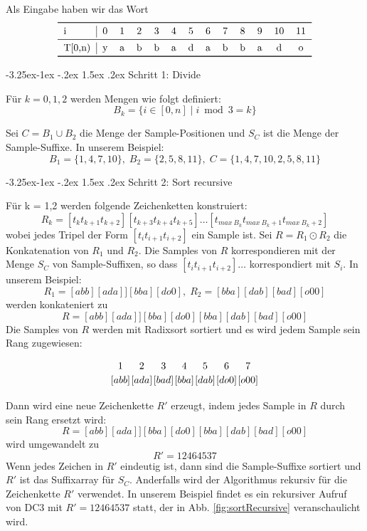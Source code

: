\documentclass[12pt]{report}
\makeatletter
\renewcommand\paragraph{\@startsection{paragraph}{4}{\z@}%
    {-3.25ex\@plus -1ex \@minus -.2ex}%
    {1.5ex \@plus .2ex}%
    {\normalfont\normalsize\bfseries}}
\makeatother
\begin{document}
Als Eingabe haben wir das Wort
$$
\begin{tabular}{l|c c c c c c c c c c c c}
    \toprule
    i    & 0 & 1 & 2 & 3 & 4 & 5 & 6 & 7 & 8 & 9 & 10 & 11 \\
    \midrule
    T[0,n) & y & a & b & b & a & d & a & b & b & a & d  & o  \\
    \bottomrule
\end{tabular}
$$

\paragraph{Schritt 1: Divide}

Für $k = 0,1,2$ werden Mengen wie folgt definiert:
$$
B_k = \{ i \in [0,n] \mid i \bmod{3} = k\}
$$

Sei $C = B_1 \cup B_2$ die Menge der Sample-Positionen und $S_C$ ist die Menge der Sample-Suffixe. In unserem Beispiel:
$$
B_1 = \{1,4,7,10\},\;B_2 = \{2,5,8,11\},\;C = \{1,4,7,10,2,5,8,11\}
$$

\paragraph{Schritt 2: Sort recursive}

Für k = 1,2 werden folgende Zeichenketten konstruiert:
$$
R_k = [t_k t_{k+1} t_{k+2}][t_{k+3} t_{k+4} t_{k+5}] \dots [t_{max\:B_k} t_{max\:B_k + 1} t_{max\:B_k + 2}]
$$
wobei jedes Tripel der Form $[t_i t_{i+1} t_{i+2}]$ ein Sample ist. Sei $R = R_1 \odot R_2$ die Konkatenation von $R_1$ und $R_2$. Die Samples von $R$ korrespondieren mit der Menge $S_C$ von Sample-Suffixen, so dass $[t_i t_{i+1} t_{i+2}] \dots$ korrespondiert mit $S_i$. In unserem Beispiel:
$$
R_1 = [abb][ada]][bba][do0],\;R_2 = [bba][dab][bad][o00]
$$
werden konkateniert zu
$$
R = [abb][ada]][bba][do0][bba][dab][bad][o00]
$$
Die Samples von $R$ werden mit Radixsort sortiert und es wird jedem Sample sein Rang zugewiesen:
$$
\centering
\begin{tikzpicture}
    [
        matrix of nodes/.style = {
        execute at begin cell = \node\bgroup,
        execute at end cell = \egroup;%
    }]
    \matrix[ampersand replacement = \&, column sep = -2mm, matrix of nodes]
    {
        $1$ \&
        $2$\&
        $3$ \&
        $4$ \&
        $5$ \&
        $6$ \&
        $7$ \\
        \color{black}$[abb]$ \&
        \color{black}$[ada]$ \&
        \color{black}$[bad]$ \&
        \color{black}$[bba]$ \&
        \color{black}$[dab]$ \&
        \color{black}$[do0]$ \&
        \color{black}$[o00]$ \\
    };
\end{tikzpicture}
$$
Dann wird eine neue Zeichenkette $R'$ erzeugt, indem jedes Sample in $R$ durch sein Rang ersetzt wird:
$$
R = [abb][ada]][bba][do0][bba][dab][bad][o00]
$$
wird umgewandelt zu
$$
R' = 12464537
$$
Wenn jedes Zeichen in $R'$ eindeutig ist, dann sind die Sample-Suffixe sortiert und $R'$ ist das Suffixarray für $S_C$. Anderfalls wird der Algorithmus rekursiv für die Zeichenkette $R'$ verwendet. In unserem Beispiel findet es ein rekursiver Aufruf von DC3 mit $R' = 12464537$ statt, der in Abb. \ref{fig:sortRecursive} veranschaulicht wird.
\end{document}
